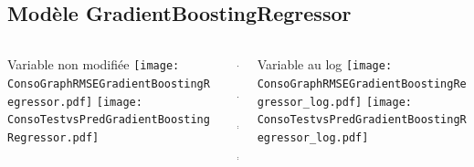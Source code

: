 \documentclass[8pt,aspectratio=169,hyperref={unicode=true}]{beamer}
\begin{document}
\subsection{Modèle GradientBoostingRegressor}
\begin{frame}{\insertsubsection}
  \begin{columns}[t]
    \begin{column}{.31\textwidth}
      \centering Variable non modifiée
      \texttt{[image: ConsoGraphRMSEGradientBoostingRegressor.pdf]}
      \texttt{[image: ConsoTestvsPredGradientBoostingRegressor.pdf]}
    \end{column}
    \begin{column}{.38\textwidth}
      $\Longleftarrow$
      \scriptsize
      {\centering
        }
      

      \normalsize
      $\Longleftarrow$

      \raggedleft $\Longrightarrow$
      \scriptsize
      {\centering
        }
      

      \normalsize
      $\Longrightarrow$
    \end{column}
    \begin{column}{.31\textwidth}
      \centering Variable au log
      \texttt{[image: ConsoGraphRMSEGradientBoostingRegressor\_log.pdf]}
      \texttt{[image: ConsoTestvsPredGradientBoostingRegressor\_log.pdf]}
    \end{column}
  \end{columns}
\end{frame}
\end{document}

